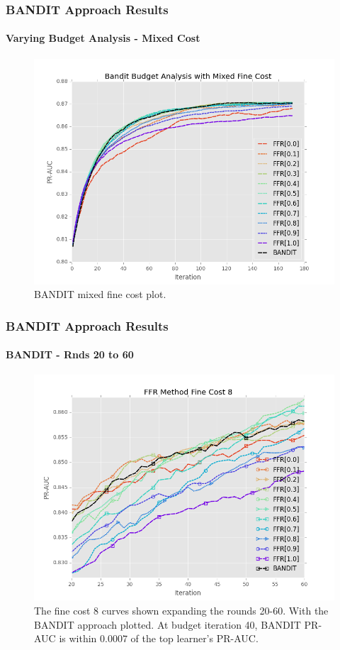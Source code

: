 \documentclass{beamer}
\begin{document}
\begin{frame}
    \frametitle{BANDIT Approach Results}
    \framesubtitle{Varying Budget Analysis - Mixed Cost}
    \begin{figure}[!htb]
        \centering
        \includegraphics[width=0.70\columnwidth]{fig/BanditMixedCostPR}
        \caption{BANDIT mixed fine cost plot.}
        \label{fig:BanditMixedCostPR}
    \end{figure}
\end{frame}
\begin{frame}
    \frametitle{BANDIT Approach Results}
    \framesubtitle{BANDIT - Rnds 20 to 60}
    \begin{figure}[!htb]
        \centering
        \includegraphics[width=0.70\columnwidth]{fig/BANDIT_PR_Cost8_rnds20_60}
        \caption{
        The fine cost 8 curves shown expanding the rounds 20-60. With the BANDIT approach
        plotted. At budget iteration 40, BANDIT PR-AUC is within $0.0007$ of the top learner's
        PR-AUC.
        }
        \label{fig:BANDIT_PR_Cost8_rnds20_60}
    \end{figure}
\end{frame}
\end{document}

